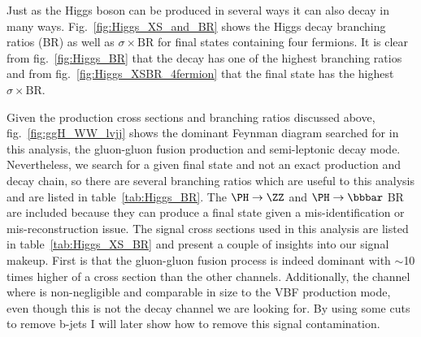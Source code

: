 Just as the Higgs boson can be produced in several ways it can also decay in many ways.
Fig.~\ref{fig:Higgs_XS_and_BR} shows the Higgs decay branching ratios (BR) as well as $\sigma\times\text{BR}$ for final states containing four fermions.
It is clear from fig.~\ref{fig:Higgs_BR} that the \WW decay has one of the highest branching ratios and from fig.~\ref{fig:Higgs_XSBR_4fermion} that the \lvqq final state has the highest $\sigma\times\text{BR}$.

Given the production cross sections and branching ratios discussed above, fig.~\ref{fig:ggH_WW_lvjj} shows the dominant Feynman diagram searched for in this analysis, the gluon-gluon fusion production and semi-leptonic \W decay mode.
Nevertheless, we search for a given final state and not an exact production and decay chain, so there are several branching ratios which are useful to this analysis and are listed in table~\ref{tab:Higgs_BR}.
The $\PH\rightarrow\ZZ$ and $\PH\rightarrow\bbbar$ BR are included because they can produce a \lvqq final state given a mis-identification or mis-reconstruction issue.
The signal cross sections used in this analysis are listed in table~\ref{tab:Higgs_XS_BR} and present a couple of insights into our signal makeup.
First is that the gluon-gluon fusion process is indeed dominant with $\sim$10 times higher of a cross section than the other channels.
Additionally, the \WH channel where \Hbb is non-negligible and comparable in size to the VBF production mode, even though this is not the decay channel we are looking for.
By using some cuts to remove b-jets I will later show how to remove this signal contamination.


